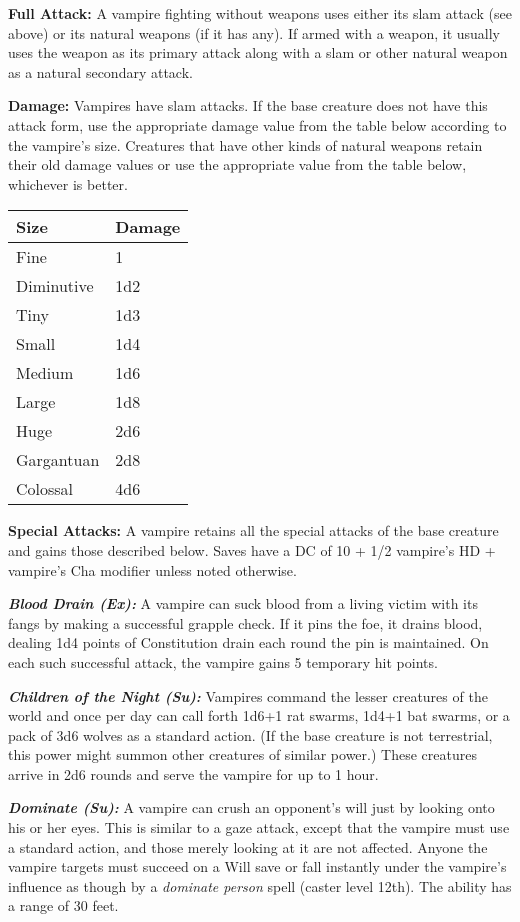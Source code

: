 \documentclass{article}
\begin{document}
\textbf{Full Attack:} A vampire fighting without weapons uses either its slam attack 
(see above) or its natural weapons (if it has any). If armed with a weapon, it 
usually uses the weapon as its primary attack along with a slam or other natural 
weapon as a natural secondary attack. 

\textbf{Damage:} Vampires have slam attacks. If the base creature does not have 
this attack form, use the appropriate damage value from the table below according 
to the vampire's size. Creatures that have other kinds of natural weapons retain 
their old damage values or use the appropriate value from the table below, whichever 
is better.

\begin{tabular}{|>{\raggedright}p{45pt}|>{\raggedright}p{26pt}|}
\hline
S\textbf{ize} & D{\small{}\textbf{amage}}\tabularnewline
\hline
Fine & 1\tabularnewline
\hline
Diminutive & 1d2\tabularnewline
\hline
Tiny & 1d3\tabularnewline
\hline
Small & 1d4\tabularnewline
\hline
Medium & 1d6\tabularnewline
\hline
Large & 1d8\tabularnewline
\hline
Huge & 2d6\tabularnewline
\hline
Gargantuan & 2d8\tabularnewline
\hline
Colossal & 4d6\tabularnewline
\hline
\end{tabular}

\textbf{Special Attacks:} A vampire retains all the special attacks of the base 
creature and gains those described below. Saves have a DC of 10 + 1/2 vampire's 
HD + vampire's Cha modifier unless noted otherwise.

\textit{\textbf{Blood Drain (Ex):}}\textit{ }A vampire can suck blood from a living 
victim with its fangs by making a successful grapple check. If it pins the foe, 
it drains blood, dealing 1d4 points of Constitution drain each round the pin is 
maintained. On each such successful attack, the vampire gains 5 temporary hit points.

\textit{\textbf{Children of the Night (Su):}}\textit{ }Vampires command the lesser 
creatures of the world and once per day can call forth 1d6+1 rat swarms, 1d4+1 
bat swarms, or a pack of 3d6 wolves as a standard action. (If the base creature 
is not terrestrial, this power might summon other creatures of similar power.) 
These creatures arrive in 2d6 rounds and serve the vampire for up to 1 hour.

\textit{\textbf{Dominate (Su):}}\textit{ }A vampire can crush an opponent's will 
just by looking onto his or her eyes. This is similar to a gaze attack, except 
that the vampire must use a standard action, and those merely looking at it are 
not affected. Anyone the vampire targets must succeed on a Will save or fall instantly 
under the vampire's influence as though by a \textit{dominate person }spell (caster 
level 12th). The ability has a range of 30 feet.
\end{document}
